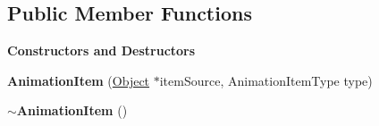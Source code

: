 \subsection*{Public Member Functions}
\begin{Indent}\textbf{ Constructors and Destructors}\par
\begin{DoxyCompactItemize}
\item 
\mbox{\label{classrev_1_1_view_1_1_animation_item_ab12f2ac735f265af085834561ff0fc87}} 
{\bfseries Animation\+Item} (\mbox{\hyperlink{classrev_1_1_object}{Object}} $\ast$item\+Source, Animation\+Item\+Type type)
\item 
\mbox{\label{classrev_1_1_view_1_1_animation_item_a40b1c5870d467937f6a8a494cde3bad6}} 
{\bfseries $\sim$\+Animation\+Item} ()
\end{DoxyCompactItemize}
\end{Indent}
